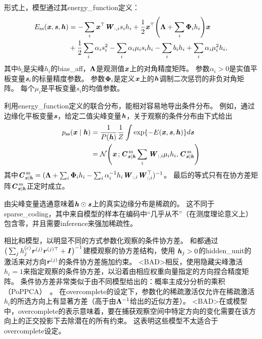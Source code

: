 形式上，模型通过其\gls{energy_function}定义：
\begin{align}
 E_{\text{ss}}(\Vx, \Vs, \Vh) &= - \sum_i \Vx^\top \MW_{:,i} s_i h_i + \frac{1}{2} \Vx^\top
 \Bigg( \VLambda + \sum_i \VPhi_i h_i \Bigg) \Vx \\
 &+ \frac{1}{2} \sum_i \alpha_i s_i^2 - \sum_i \alpha_i \mu_i s_i h_i - \sum_i b_i h_i 
 + \sum_i \alpha_i \mu_i^2 h_i,
 \end{align}
其中$b_i$是尖峰$h_i$的\gls{bias_aff}，$\VLambda$是观测值$\Vx$上的对角精度矩阵。
参数$\alpha_i > 0$是实值平板变量$\Vs_i$的标量精度参数。
参数$\VPhi_i$是定义$\Vx$上的$\Vh$调制二次惩罚的非负对角矩阵。
每个$\mu_i$是平板变量$s_i$的均值参数。


利用\gls{energy_function}定义的联合分布，能相对容易地导出条件分布。
例如，通过边缘化平板变量$\Vs$，给定二值尖峰变量$\Vh$，关于观察的条件分布由下式给出
\begin{align}
 p_{\text{ss}} (\Vx  \mid  \Vh) &= \frac{1}{P(\Vh)} \frac{1}{Z} \int \exp\{ -E(\Vx, \Vs, \Vh) \} d\Vs \\
 &= \CalN \Bigg( \Vx\,; \MC_{\Vx \mid \Vh}^{\,\text{ss}} \sum_i \MW_{:,i}\mu_i h_i, 
  \MC_{\Vx \mid \Vh}^{\,\text{ss}} \Bigg)
\end{align}
其中$ \MC_{\Vx \mid \Vh}^{\,\text{ss}} = (\VLambda + \sum_i \VPhi_i h_i 
-\sum_i \alpha_i^{-1} h_i \MW_{:,i}\MW_{:,i}^\top)^{-1}$。
最后的等式只有在协方差矩阵$\MC_{\Vx \mid \Vh}^{\,\text{ss}} $正定时成立。

由尖峰变量选通意味着$\Vh \odot \Vs$上的真实边缘分布是稀疏的。
这不同于\gls{sparse_coding}，其中来自模型的样本在编码中``几乎从不''（在测度理论意义上）包含零，并且需要\gls{inference}来强加稀疏性。


相比和模型，以明显不同的方式参数化观察的条件协方差。
和都通过 $\big( \sum_j h_j^{(c)} \Vr^{(j)} \Vr^{(j)\top} + \MI \big)^{-1}$建模观察的协方差结构，使用 $\Vh_j > 0$的\gls{hidden_unit}的激活来对方向$\Vr^{(j)}$的条件协方差施加约束。
<BAD>相反，使用隐藏尖峰激活$h_i = 1$来指定观察的条件协方差，以沿着由相应权重向量指定的方向捏合精度矩阵。
条件协方差非常类似于由不同模型给出的：概率主成分分析的乘积（PoPPCA）~\citep{Williams2002}。
在\gls{overcomplete}的设定下，参数化的稀疏激活仅允许在稀疏激活$h_i$的所选方向上有显著方差（高于由$\VLambda^{-1}$给出的近似方差）。
<BAD>在或模型中，\gls{overcomplete}的表示意味着，要在捕获观察空间中特定方向的变化需要在该方向上的正交投影下去除潜在的所有约束。
这表明这些模型不太适合于\gls{overcomplete}设定。

